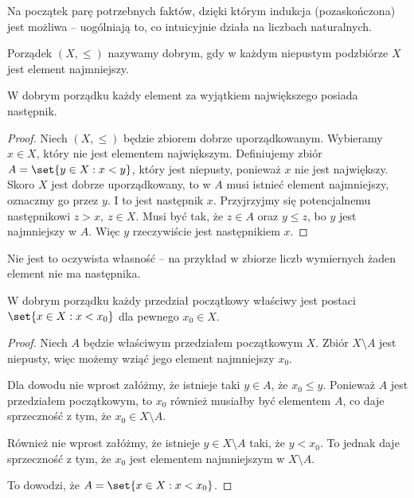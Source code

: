 Na początek parę potrzebnych faktów, dzięki którym indukcja (pozaskończona) jest możliwa -- uogólniają to, co intuicyjnie działa na liczbach naturalnych.

\begin{definition}
    Porządek \( (X, \leq) \) nazywamy dobrym, gdy w każdym niepustym podzbiórze \( X \) jest element najmniejszy.
\end{definition}

\begin{theorem}
    W dobrym porządku każdy element za wyjątkiem największego posiada następnik.
\end{theorem}
\begin{proof}
    Niech \( (X, \leq) \) będzie zbiorem dobrze uporządkowanym. Wybieramy \( x \in X \), który nie jest elementem największym.
    Definiujemy zbiór \( A = \set{y \in X : x < y} \), który jest niepusty, ponieważ \( x \) nie jest największy. Skoro \( X \) jest dobrze uporządkowany, to w \( A \) musi istnieć element najmniejszy, oznaczmy go przez \( y \).
    I to jest następnik \( x \). Przyjrzyjmy się potencjalnemu następnikowi \( z > x, \ z \in X \). Musi być tak, że \( z \in A \) oraz \( y \leq z \), bo \( y \) jest najmniejszy w \( A \).
    Więc \( y \) rzeczywiście jest następnikiem \( x \).
\end{proof}
Nie jest to oczywista własność -- na przykład w zbiorze liczb wymiernych żaden element nie ma następnika.

\begin{theorem}
    W dobrym porządku każdy przedział początkowy właściwy jest postaci \( \set{x \in X : x < x_0} \) dla pewnego \( x_0 \in X \).
\end{theorem}
\begin{proof}
    Niech \( A \) będzie właściwym przedziałem początkowym \( X \). Zbiór \( X \setminus A \) jest niepusty, więc możemy wziąć jego element najmniejszy \( x_0 \).

    Dla dowodu nie wprost załóżmy, że istnieje taki \( y \in A \), że \( x_0 \leq y \). Ponieważ \( A \) jest przedziałem początkowym, to \( x_0 \) również musiałby być elementem \( A \), co daje sprzeczność z tym, że \( x_0 \in X \setminus A \).

    Również nie wprost załóżmy, że istnieje \( y \in X \setminus A \) taki, że \( y < x_0 \). To jednak daje sprzeczność z tym, że \( x_0 \) jest elementem najmniejszym w \( X \setminus A \).

    To dowodzi, że \( A = \set{x \in X : x < x_0} \).
\end{proof}

